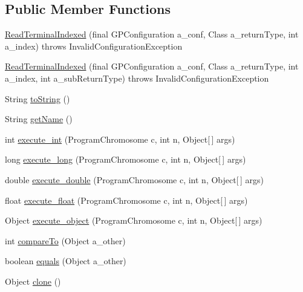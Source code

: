 \subsection*{Public Member Functions}
\begin{DoxyCompactItemize}
\item 
\hyperlink{classorg_1_1jgap_1_1gp_1_1function_1_1_read_terminal_indexed_a48dbab8c34f491cd78a680a6915029ba}{Read\-Terminal\-Indexed} (final G\-P\-Configuration a\-\_\-conf, Class a\-\_\-return\-Type, int a\-\_\-index)  throws Invalid\-Configuration\-Exception 
\item 
\hyperlink{classorg_1_1jgap_1_1gp_1_1function_1_1_read_terminal_indexed_a30ee4e83d4e054ee0a06fc1ac2e72c5e}{Read\-Terminal\-Indexed} (final G\-P\-Configuration a\-\_\-conf, Class a\-\_\-return\-Type, int a\-\_\-index, int a\-\_\-sub\-Return\-Type)  throws Invalid\-Configuration\-Exception 
\item 
String \hyperlink{classorg_1_1jgap_1_1gp_1_1function_1_1_read_terminal_indexed_a859bb783480c14b9fe53f41bede4a7c2}{to\-String} ()
\item 
String \hyperlink{classorg_1_1jgap_1_1gp_1_1function_1_1_read_terminal_indexed_a300b8cace252875b3ad9981647f09a5f}{get\-Name} ()
\item 
int \hyperlink{classorg_1_1jgap_1_1gp_1_1function_1_1_read_terminal_indexed_a582f87e9b18e2e83e4315a333e082524}{execute\-\_\-int} (Program\-Chromosome c, int n, Object\mbox{[}$\,$\mbox{]} args)
\item 
long \hyperlink{classorg_1_1jgap_1_1gp_1_1function_1_1_read_terminal_indexed_a15d6d88b97d9550a90ae668b61873f81}{execute\-\_\-long} (Program\-Chromosome c, int n, Object\mbox{[}$\,$\mbox{]} args)
\item 
double \hyperlink{classorg_1_1jgap_1_1gp_1_1function_1_1_read_terminal_indexed_a5fb8be99bf358e32ea8f9d8eb7871d95}{execute\-\_\-double} (Program\-Chromosome c, int n, Object\mbox{[}$\,$\mbox{]} args)
\item 
float \hyperlink{classorg_1_1jgap_1_1gp_1_1function_1_1_read_terminal_indexed_a317160f140e87d0bd6ed1b6a9c654a37}{execute\-\_\-float} (Program\-Chromosome c, int n, Object\mbox{[}$\,$\mbox{]} args)
\item 
Object \hyperlink{classorg_1_1jgap_1_1gp_1_1function_1_1_read_terminal_indexed_afc6421cfcd65ba19e9210a6b9b36d467}{execute\-\_\-object} (Program\-Chromosome c, int n, Object\mbox{[}$\,$\mbox{]} args)
\item 
int \hyperlink{classorg_1_1jgap_1_1gp_1_1function_1_1_read_terminal_indexed_a26924a111c027b30048f32c1bb82a84e}{compare\-To} (Object a\-\_\-other)
\item 
boolean \hyperlink{classorg_1_1jgap_1_1gp_1_1function_1_1_read_terminal_indexed_ae78f158bc8df619334ff927913b44169}{equals} (Object a\-\_\-other)
\item 
Object \hyperlink{classorg_1_1jgap_1_1gp_1_1function_1_1_read_terminal_indexed_a31d4aa64e8444d3cbe6c51109e3a3611}{clone} ()
\end{DoxyCompactItemize}
